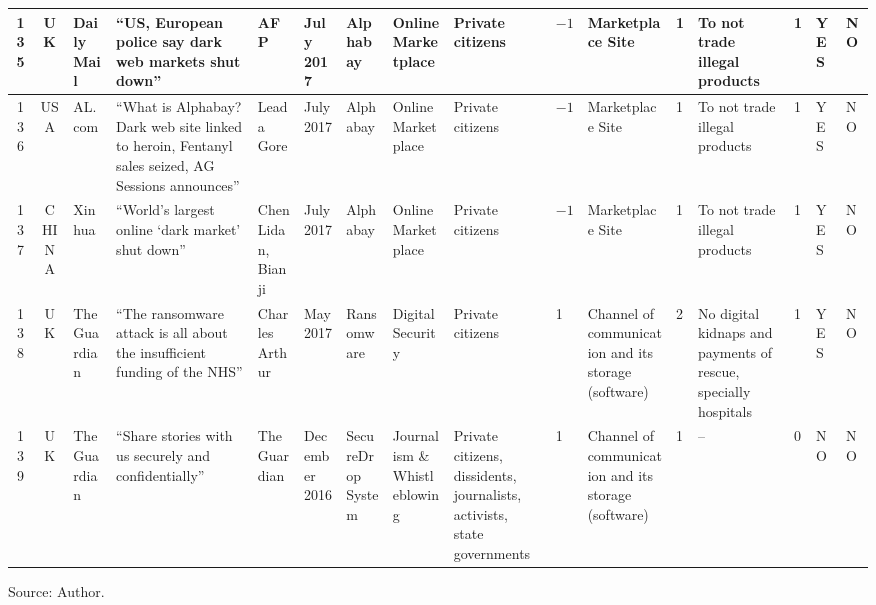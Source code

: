 \begin{landscape}
{\begin{longtable}{|c|c|p{1.2cm}|p{2.5cm}|p{1.4cm}|p{1.2cm}|p{1.4cm}|p{1.2cm}|p{1.8cm}|p{0.4cm}|p{1.8cm}|p{0.4cm}|p{1.5cm}|p{0.4cm}|p{0.6cm}|p{0.6cm}|}
\hline
135 & UK & Daily Mail & ``US, European police say dark web markets shut down'' & AFP & July 2017 &Alphabay & Online Marketplace & Private citizens & $-1$ & Marketplace Site & 1 & To not trade illegal products & 1 & YES & NO \\
\hline
136 & USA & AL.com & ``What is Alphabay? Dark web site linked to heroin, Fentanyl sales seized, AG Sessions announces'' & Leada Gore & July 2017 &Alphabay & Online Marketplace & Private citizens & $-1$ & Marketplace Site & 1 & To not trade illegal products & 1 & YES & NO \\
\hline
137 & CHINA & Xinhua & ``World's largest online `dark market' shut down'' & Chen Lidan, Bianji & July 2017 &Alphabay & Online Marketplace & Private citizens & $-1$ & Marketplace Site & 1 & To not trade illegal products & 1 & YES & NO \\
\hline
138 & UK & The Guardian & ``The ransomware attack is all about the insufficient funding of the NHS'' & Charles Arthur & May 2017 &Ransomware & Digital Security & Private citizens & 1 & Channel of communication and its storage (software) & 2 & No digital kidnaps and payments of rescue, specially hospitals & 1 & YES & NO \\
\hline
139 & UK & The Guardian & ``Share stories with us securely and confidentially'' & The Guardian & December 2016 &SecureDrop System & Journalism \& Whistleblowing & Private citizens, dissidents, journalists, activists, state governments & 1 & Channel of communication and its storage (software) & 1 & -- & 0 & NO & NO \\
\hline

\end{longtable}
}

\vspace{0.5cm}
\noindent Source: Author.

\end{landscape}
\restoregeometry
